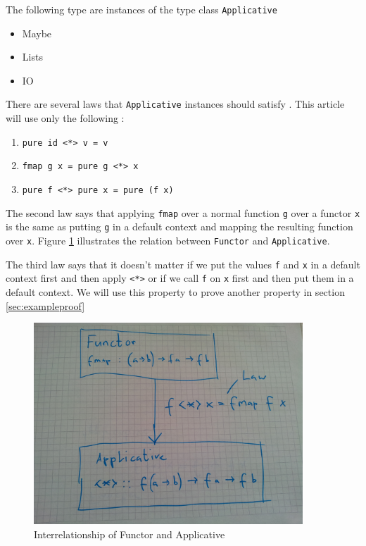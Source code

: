 The following type are instances of the type class \verb|Applicative|

\begin{itemize}
\item Maybe
\item Lists
\item IO
\end{itemize}

There are several laws that \verb|Applicative| instances should satisfy \cite{mcbride} \cite{control.applicative}. This article will use only the following :

\begin{enumerate}
\item \verb|pure id <*> v = v|
\item \verb|fmap g x = pure g <*> x|
\item \verb|pure f <*> pure x = pure (f x)|
\end{enumerate}

The second law says that applying \verb|fmap| over a normal function \verb|g| over a functor \verb|x| is the same as putting \verb|g| in a default context and mapping the resulting function over \verb|x|. Figure \ref{fig:functor_applicative} illustrates the relation between \verb|Functor| and \verb|Applicative|.

The third law says that it doesn't matter if we put the values \verb|f| and \verb|x| in a default context first and then apply \verb|<*>| or if we call \verb|f| on \verb|x| first and then put them in a default context. We will use this property to prove another property in section \ref{sec:exampleproof}

\begin{figure}
  \centering
     \includegraphics[width=0.9\textwidth]{functor_applicative}
  \caption{Interrelationship of Functor and Applicative}
  \label{fig:functor_applicative}
\end{figure}

